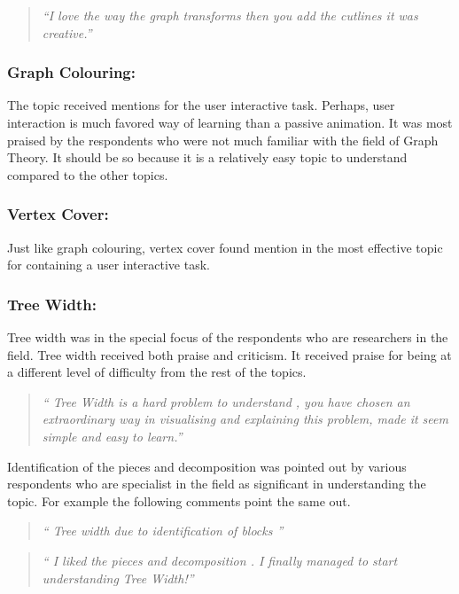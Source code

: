 \begin{quote}
\emph{``I love the way the graph transforms then you add the cutlines it was
creative.''}
\end{quote}

\subsubsection{Graph Colouring:}
The topic received mentions for the user interactive task. Perhaps, user
interaction is much favored way of learning than a passive animation.
It was most praised by the respondents who were not much familiar with
the field of Graph Theory. It should be so because it is a relatively easy
topic to understand compared to the other topics.

\subsubsection{Vertex Cover:}
Just like graph colouring, vertex cover found mention in the most effective topic for 
containing a user interactive task.

\subsubsection{Tree Width:}
Tree width was in the special focus of the respondents who are researchers in
the field.  Tree width received both praise and criticism. It received praise
for being at a different level of difficulty from the rest of the topics.

\begin{quote}
\emph{``
Tree Width is a hard problem to understand , you
have chosen an extraordinary way in visualising and explaining this
problem, made it seem simple and easy to learn.''}
\end{quote}

Identification of the pieces and decomposition was pointed out by various
respondents who are specialist in the field as significant in understanding the
topic. For example the following comments point the same out.

\begin{quote}
\emph{``
Tree width due to identification of blocks
''}
\end{quote}
\begin{quote}
\emph{``
I liked the pieces and decomposition .
I finally managed to start understanding Tree Width!''}
\end{quote}

